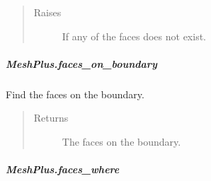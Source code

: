 \documentclass[letterpaper,10pt,english]{sphinxmanual}
\begin{document}
\begin{fulllineitems}
\begin{fulllineitems}
\begin{quote}
\begin{description}
\item[{Raises}] \leavevmode
{} \textendash{} If any of the faces does not exist.

\end{description}\end{quote}

\end{fulllineitems}



\subparagraph{MeshPlus.faces\_on\_boundary}
\label{\detokenize{api/generated/directional_clustering.mesh.MeshPlus.faces_on_boundary:meshplus-faces-on-boundary}}\label{\detokenize{api/generated/directional_clustering.mesh.MeshPlus.faces_on_boundary::doc}}

\begin{fulllineitems}
\label{\detokenize{api/generated/directional_clustering.mesh.MeshPlus.faces_on_boundary:directional_clustering.mesh.MeshPlus.faces_on_boundary}}
Find the faces on the boundary.
\begin{quote}\begin{description}
\item[{Returns}] \leavevmode
{} \textendash{} The faces on the boundary.

\end{description}\end{quote}

\end{fulllineitems}



\subparagraph{MeshPlus.faces\_where}
\label{\detokenize{api/generated/directional_clustering.mesh.MeshPlus.faces_where:meshplus-faces-where}}\label{\detokenize{api/generated/directional_clustering.mesh.MeshPlus.faces_where::doc}}


\end{fulllineitems}
\end{document}
